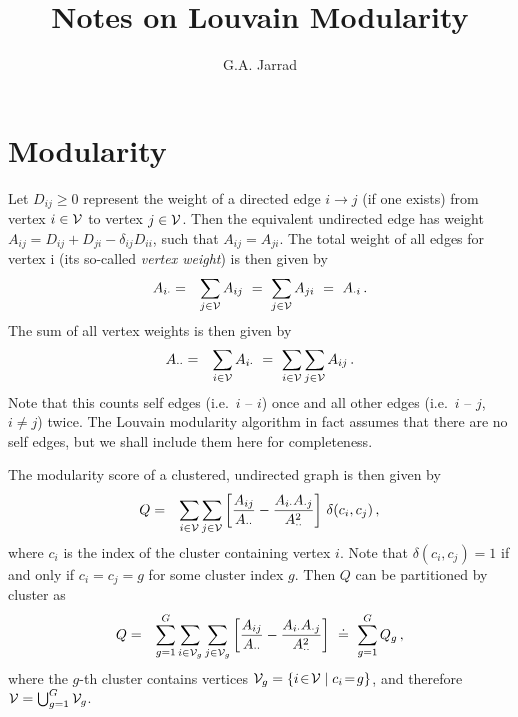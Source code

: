 \documentclass[a4paper]{article}
\title{Notes on Louvain Modularity}
\author{G.A. Jarrad}
\begin{document}
\maketitle
{}
\section{Modularity}\label{sec:Q}
Let $D_{ij}\ge 0$ represent the weight of a directed edge
$i\rightarrow j$ (if one exists) from vertex $i\in{\cal V}$ to vertex $j\in{\cal V}$. 
Then the equivalent undirected edge has weight
$A_{ij}=D_{ij}+D_{ji}-\delta_{ij}D_{ii}$, such that $A_{ij}=A_{ji}$. The total
weight of all edges for vertex i (its so-called {\em vertex weight}) is then given by
\begin{eqnarray}
  A_{i\cdot} & = & \sum_{j\in{\cal V}} A_{ij}~=~\sum_{j\in{\cal V}} A_{ji}~=~A_{\cdot i}\,.
\end{eqnarray}
The sum of all vertex weights is then given by
\begin{eqnarray}
  A_{\cdot\cdot} & = & \sum_{i\in{\cal V}} A_{i\cdot}
  ~=~\sum_{i\in{\cal V}}\sum_{j\in{\cal V}} A_{ij}\,.
\end{eqnarray}
Note that this counts self edges (i.e.\ $i$ -- $i$) once and all other edges (i.e.\ $i$ -- $j$, 
$i\ne j$) twice. The Louvain modularity algorithm in fact assumes that there are no self edges, but we
shall include them here for completeness.

The modularity score of a clustered, undirected graph is then given by
\begin{eqnarray}
  Q & = & \sum_{i\in{\cal V}}\sum_{j\in{\cal V}} \left[
  \frac{A_{ij}}{A_{\cdot\cdot}}-
  \frac{A_{i\cdot}A_{\cdot j}}{A_{\cdot\cdot}^2}
  \right]\,\delta(c_i,c_j)\,,
\end{eqnarray}
where $c_i$ is the index of the cluster containing vertex $i$. Note that
$\delta(c_i,c_j)=1$ if and only if $c_i=c_j=g$ for some cluster index $g$. Then $Q$ can be
partitioned by cluster as
\begin{eqnarray}
  Q & = & \sum_{g=1}^G\sum_{i\in{\cal V}_g}\sum_{j\in{\cal V}_g} \left[
  \frac{A_{ij}}{A_{\cdot\cdot}}-
  \frac{A_{i\cdot}A_{\cdot j}}{A_{\cdot\cdot}^2}
  \right]~\doteq~\sum_{g=1}^G Q_g\,,
\label{eq:Qg}
\end{eqnarray}
where the $g$-th cluster contains vertices ${\cal V}_g=\{i\!\in\!{\cal V}\;|\;c_i\!=\!g\}$,
and therefore ${\cal V}=\bigcup_{g=1}^G {\cal V}_g$.
\end{document}
